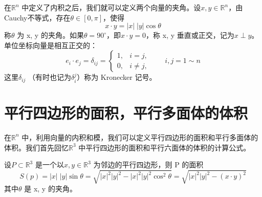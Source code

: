 \documentclass{article}
\begin{document}
\newpage

在\(\mathbb{R}^n\) 中定义了内积之后，我们就可以定义两个向量的夹角。设\(x, y \in \mathbb{R}^n\)，由 Cauchy不等式，存在\(\theta \in [0, \pi]\)，使得
\begin{equation*}
    x \cdot y =| x |\; | y | \cos \theta
\end{equation*}
称\(\theta \) 为 x, y 的夹角。如果\(\theta = 90^\circ\)，即\(x \cdot y = 0\)，称 x, y 垂直或正交，记为\(x \perp y\)。单位坐标向量是相互正交的：
\begin{equation*}
    e_i \cdot e_j =\delta_{ij} =
    \begin{cases}
        1, & i = j, \\
        0, & i \neq j,
    \end{cases}
    \qquad i,j = 1 \sim n
\end{equation*}
这里\(\delta_{ij}\) （有时也记为\(\delta_i^j\)）称为 Kronecker 记号。

\newpage

\section{平行四边形的面积，平行多面体的体积}
在\(\mathbb{R}^n\) 中，利用向量的内积和模，我们可以定义平行四边形的面积和平行多面体的体积。我们首先回忆\(\mathbb{R}^3\) 中平行四边形的面积和平行六面体的体积的计算公式。

\vspace{20pt}
\noindent 设\(P \subset \mathbb{R}^3 \) 是一个以\(x, y \in \mathbb{R}^3\) 为邻边的平行四边形，则 P 的面积
\begin{equation*}
    S(p) = |x|\; |y| \sin \theta = \sqrt{ |x|^2 |y|^2 - |x|^2 |y|^2 \cos^2\theta} = \sqrt{ |x|^2 |y|^2 -(x \cdot y)^2}
\end{equation*}
其中\(\theta \) 是 x, y 的夹角。

\vspace{20pt}

\begin{center}
\end{center}
\end{document}
